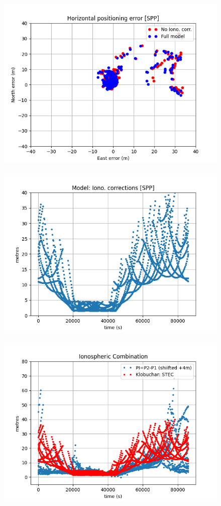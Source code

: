 \begin{figure}[H]
        \centering
        \includegraphics[scale=0.52]{sources/Figures/FIG_2/TUT2_Ex3.4.2d.png}
        \caption{}
        \label{}
\end{figure}


\begin{figure}[H]
        \centering
        \includegraphics[scale=0.52]{sources/Figures/FIG_2/TUT2_Ex3.4.2e.png}
        \caption{}
        \label{}
\end{figure}


\begin{figure}[H]
        \centering
        \includegraphics[scale=0.52]{sources/Figures/FIG_2/TUT2_Ex3.4.2f.png}
        \caption{}
        \label{}
\end{figure}